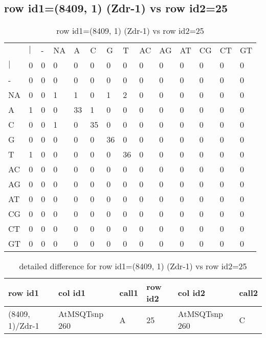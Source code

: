 \subsection{row id1=(8409, 1) (Zdr-1) vs row id2=25}
\begin{center}
\begin{longtable}{|l|l|l|l|l|l|l|l|l|l|l|l|l|l|}
\caption{row id1=(8409, 1) (Zdr-1) vs row id2=25} \label{table_dm674}\\
\hline
\\
\hline
&$|$&-&NA&A&C&G&T&AC&AG&AT&CG&CT&GT\\
$|$&0&0&0&0&0&0&0&0&0&0&0&0&0\\
-&0&0&0&0&0&0&0&0&0&0&0&0&0\\
NA&0&0&1&1&0&1&2&0&0&0&0&0&0\\
A&1&0&0&33&1&0&0&0&0&0&0&0&0\\
C&0&0&1&0&35&0&0&0&0&0&0&0&0\\
G&0&0&0&0&0&36&0&0&0&0&0&0&0\\
T&1&0&0&0&0&0&36&0&0&0&0&0&0\\
AC&0&0&0&0&0&0&0&0&0&0&0&0&0\\
AG&0&0&0&0&0&0&0&0&0&0&0&0&0\\
AT&0&0&0&0&0&0&0&0&0&0&0&0&0\\
CG&0&0&0&0&0&0&0&0&0&0&0&0&0\\
CT&0&0&0&0&0&0&0&0&0&0&0&0&0\\
GT&0&0&0&0&0&0&0&0&0&0&0&0&0\\
\hline
\end{longtable}
\end{center}

\begin{center}
\begin{longtable}{|l|l|l|l|l|l|}
\caption{detailed difference for row id1=(8409, 1) (Zdr-1) vs row id2=25} \label{table_dm675}\\
\hline
row id1&col id1&call1&row id2&col id2&call2\\
\hline
(8409, 1)/Zdr-1&AtMSQTsnp 260&A&25&AtMSQTsnp 260&C\\
\hline
\end{longtable}
\end{center}

